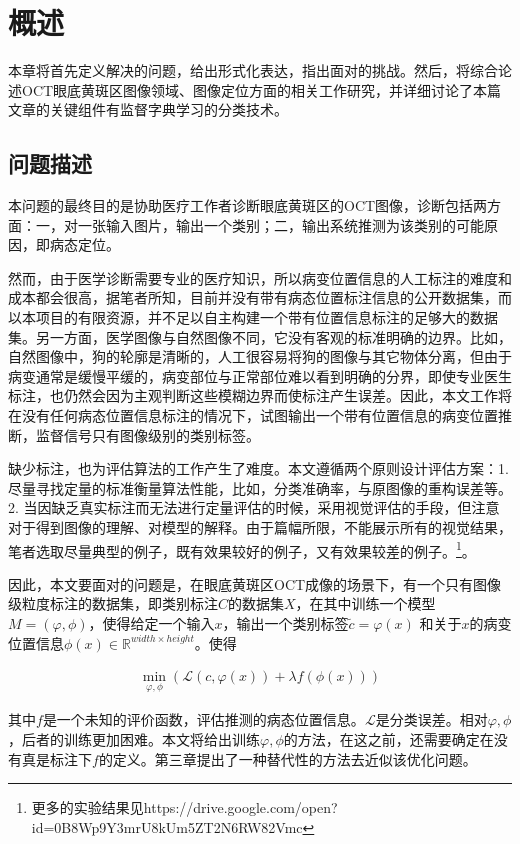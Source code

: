 \chapter{概述}
    本章将首先定义解决的问题，给出形式化表达，指出面对的挑战。然后，将综合论述OCT眼底黄斑区图像领域、图像定位方面的相关工作研究，并详细讨论了本篇文章的关键组件有监督字典学习的分类技术。

\section{问题描述}
    本问题的最终目的是协助医疗工作者诊断眼底黄斑区的OCT图像，诊断包括两方面：一，对一张输入图片，输出一个类别；二，输出系统推测为该类别的可能原因，即病态定位。

    然而，由于医学诊断需要专业的医疗知识，所以病变位置信息的人工标注的难度和成本都会很高，据笔者所知，目前并没有带有病态位置标注信息的公开数据集，而以本项目的有限资源，并不足以自主构建一个带有位置信息标注的足够大的数据集。另一方面，医学图像与自然图像不同，它没有客观的标准明确的边界。比如，自然图像中，狗的轮廓是清晰的，人工很容易将狗的图像与其它物体分离，但由于病变通常是缓慢平缓的，病变部位与正常部位难以看到明确的分界，即使专业医生标注，也仍然会因为主观判断这些模糊边界而使标注产生误差。因此，本文工作将在没有任何病态位置信息标注的情况下，试图输出一个带有位置信息的病变位置推断，监督信号只有图像级别的类别标签。

    缺少标注，也为评估算法的工作产生了难度。本文遵循两个原则设计评估方案：1. 尽量寻找定量的标准衡量算法性能，比如，分类准确率，与原图像的重构误差等。2. 当因缺乏真实标注而无法进行定量评估的时候，采用视觉评估的手段，但注意对于得到图像的理解、对模型的解释。由于篇幅所限，不能展示所有的视觉结果，笔者选取尽量典型的例子，既有效果较好的例子，又有效果较差的例子。\footnote{更多的实验结果见https://drive.google.com/open?id=0B8Wp9Y3mrU8kUm5ZT2N6RW82Vmc}。

    因此，本文要面对的问题是，在眼底黄斑区OCT成像的场景下，有一个只有图像级粒度标注的数据集，即类别标注$C$的数据集$X$，在其中训练一个模型$M=(\varphi, \phi )$，使得给定一个输入$x$，输出一个类别标签$\tilde{c} = \varphi(x)$ 和关于$x$的病变位置信息$\phi(x) \in \mathbb{R} ^{width \times height}$。使得

    \begin{align}
        \min _{\varphi, \phi} \left(\mathcal{L}(c, \varphi (x)) + \lambda f(\phi(x)) \right)
    \end{align}

    其中$f$是一个未知的评价函数，评估推测的病态位置信息。$\mathcal{L}$是分类误差。相对$\varphi, \phi$，后者的训练更加困难。本文将给出训练$\varphi, \phi$的方法，在这之前，还需要确定在没有真是标注下$f$的定义。第三章提出了一种替代性的方法去近似该优化问题。

